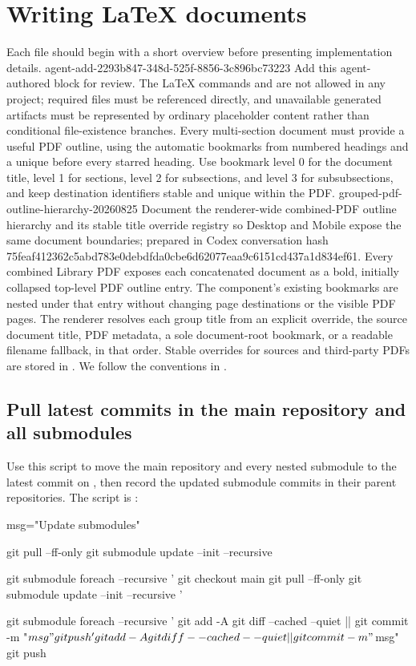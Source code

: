 \section*{Writing LaTeX documents}
Each  file should begin with a short overview before presenting implementation details.
\agentProposedEdit
  {agent-add-2293b847-348d-525f-8856-3c896bc73223}
  {Add this agent-authored block for review.}
  {}
  {The LaTeX commands  and  are not allowed in any  project; required files must be referenced directly, and unavailable generated artifacts must be represented by ordinary placeholder content rather than conditional file-existence branches.
Every multi-section document must provide a useful PDF outline, using the automatic bookmarks from numbered headings and a unique \code{\pdfbookmark} before every starred heading.
Use bookmark level 0 for the document title, level 1 for sections, level 2 for subsections, and level 3 for subsubsections, and keep destination identifiers stable and unique within the PDF.}
\agentProposedEdit
  {grouped-pdf-outline-hierarchy-20260825}
  {Document the renderer-wide combined-PDF outline hierarchy and its stable title override registry so Desktop and Mobile expose the same document boundaries; prepared in Codex conversation hash 75feaf412362c5abd783e0debdfda0cbe6d62077eaa9c6151cd437a1d834ef61.}
  {}
  {Every combined Library PDF exposes each concatenated document as a bold, initially collapsed top-level PDF outline entry.
The component's existing bookmarks are nested under that entry without changing page destinations or the visible PDF pages.
The renderer resolves each group title from an explicit override, the source document title, PDF metadata, a sole document-root bookmark, or a readable filename fallback, in that order.
Stable overrides for sources and third-party PDFs are stored in .}
We follow the conventions in
.

\subsection*{Pull latest commits in the main repository and all submodules}
Use this script to move the main repository and every nested submodule to the latest commit on , then record the updated submodule commits in their parent repositories.
The script is :
\begin{DocCode}
msg="Update submodules"

git pull --ff-only
git submodule update --init --recursive

git submodule foreach --recursive '
git checkout main
git pull --ff-only
git submodule update --init --recursive
'

git submodule foreach --recursive '
git add -A
git diff --cached --quiet || git commit -m "$msg"
git push
'

git add -A
git diff --cached --quiet || git commit -m "$msg"
git push
\end{DocCode}

